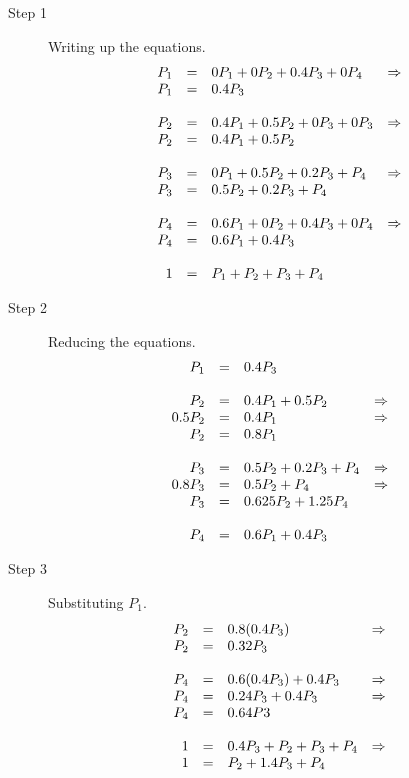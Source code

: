 \documentclass[12pt]{report}
\begin{document}
\begin{description}
	\item[Step 1] Writing up the equations.
	$$\begin{array}{r c l c}
		P_1 & = & 0P_1 + 0P_2 + 0.4P_3 + 0P_4 & \Rightarrow\\
		P_1 & = & 0.4P_3\\
		\\
		P_2 & = & 0.4P_1 + 0.5P_2 + 0P_3 + 0P_3 & \Rightarrow\\
		P_2& = & 0.4P_1 + 0.5P_2\\
		\\
		P_3 & = & 0P_1 + 0.5P_2 + 0.2P_3 + P_4 & \Rightarrow\\
		P_3 & = & 0.5P_2 + 0.2P_3 + P_4\\
		\\
		P_4 & = & 0.6P_1 + 0P_2 + 0.4P_3 + 0P_4 & \Rightarrow\\
		P_4 & = & 0.6P_1 + 0.4P_3\\
		\\
		1 & = & P_1 + P_2 + P_3 + P_4
	\end{array}$$
	
	\item[Step 2] Reducing the equations.
	$$\begin{array}{r c l c}
		P_1 & = & 0.4P_3\\
		\\
		P_2 & = & 0.4P_1 + 0.5P_2 & \Rightarrow\\
		0.5P_2 & = & 0.4P_1 & \Rightarrow\\
		P_2 & = & 0.8P_1\\
		\\
		P_3 & = & 0.5P_2 + 0.2P_3 + P_4 & \Rightarrow\\
		0.8P_3 & = & 0.5P_2 + P_4 & \Rightarrow\\
		P_3 & = & 0.625P_2 + 1.25P_4\\
		\\
		P_4 & = & 0.6P_1 + 0.4P_3
	\end{array}$$
	
	\item[Step 3] Substituting $P_1$.
	$$\begin{array}{r c l c}
		P_2 & = & 0.8(0.4P_3) & \Rightarrow\\
		P_2 & = & 0.32P_3\\
		\\
		P_4 & = & 0.6(0.4P_3) + 0.4P_3 & \Rightarrow\\
		P_4 & = & 0.24P_3 + 0.4P_3 & \Rightarrow\\
		P_4 & = & 0.64P3\\
		\\
		1 & = & 0.4P_3 + P_2 + P_3 + P_4 & \Rightarrow\\
		1 & = & P_2 + 1.4P_3 + P_4
	\end{array}$$
	

\end{description}
\end{document}
